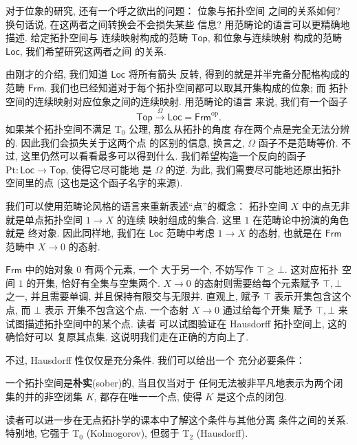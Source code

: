 对于位象的研究, 还有一个呼之欲出的问题： 位象与拓扑空间
之间的关系如何? 换句话说, 在这两者之间转换会不会损失某些
信息? 用范畴论的语言可以更精确地描述. 给定拓扑空间与
连续映射构成的范畴 \(\mathsf{Top}\), 和位象与连续映射
构成的范畴 \(\mathsf{Loc}\), 我们希望研究这两者之间
的关系.

由刚才的介绍, 我们知道 \(\mathsf{Loc}\) 将所有箭头
反转, 得到的就是并半完备分配格构成的范畴 \(\mathsf{Frm}\).
我们也已经知道对于每个拓扑空间都可以取其开集构成的位象; 而
拓扑空间的连续映射对应位象之间的连续映射. 用范畴论的语言
来说, 我们有一个函子
\[\mathsf{Top} \xrightarrow{\Omega} \mathsf{Loc}
= \mathsf{Frm}^{\mathrm{op}}.\]
如果某个拓扑空间不满足 T\(_0\) 公理, 那么从拓扑的角度
存在两个点是完全无法分辨的. 因此我们会损失关于这两个点
的区别的信息, 换言之, \(\Omega\) 函子不是范畴等价.
不过, 这里仍然可以看看最多可以得到什么.
我们希望构造一个反向的函子 \(\mathrm{Pt} :
\mathsf{Loc} \to \mathsf{Top}\), 使得它尽可能地
是 \(\Omega\) 的逆. 为此, 我们需要尽可能地还原出拓扑
空间里的点 (这也是这个函子名字的来源).

我们可以使用范畴论风格的语言来重新表述“点”的概念： 拓扑空间
\(X\) 中的点无非就是单点拓扑空间 \(1 \to X\) 的连续
映射组成的集合. 这里 \(1\) 在范畴论中扮演的角色就是
终对象. 因此同样地, 我们在 \(\mathsf{Loc}\) 范畴中考虑
\(1 \to X\) 的态射, 也就是在 \(\mathsf{Frm}\) 范畴中
\(X \to 0\) 的态射.

\(\mathsf{Frm}\) 中的始对象 \(0\) 有两个元素, 一个
大于另一个, 不妨写作 \(\top \ge \bot\). 这对应拓扑
空间 \(1\) 的开集, 恰好有全集与空集两个.
\(X \to 0\) 的态射则需要给每个元素赋予 \(\top, \bot\)
之一, 并且需要单调, 并且保持有限交与无限并. 直观上,
赋予 \(\top\) 表示开集包含这个点, 而 \(\bot\) 表示
开集不包含这个点. 一个态射 \(X \to 0\) 通过给每个开集
赋予 \(\top,\bot\) 来试图描述拓扑空间中的某个点. 读者
可以试图验证在 Hausdorff 拓扑空间上, 这的确恰好可以
复原其点集. 这说明我们走在正确的方向上了.

不过, Hausdorff 性仅仅是充分条件. 我们可以给出一个
充分必要条件：
\begin{definition}
一个拓扑空间是\textbf{朴实}(sober)的, 当且仅当对于
任何无法被非平凡地表示为两个闭集的并的非空闭集 \(K\),
都存在唯一一个点, 使得 \(K\) 是这个点的闭包.
\end{definition}
读者可以进一步在无点拓扑学的课本中了解这个条件与其他分离
条件之间的关系. 特别地, 它强于 T\(_0\) (Kolmogorov),
但弱于 T\(_2\) (Hausdorff).

